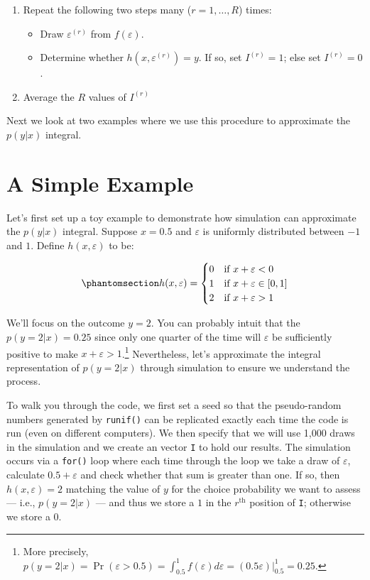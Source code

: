 \documentclass[
  letterpaper,
  DIV=11,
  numbers=noendperiod]{scrreprt}
\providecommand{\tightlist}{%
  \setlength{\itemsep}{0pt}\setlength{\parskip}{0pt}}\usepackage{longtable,booktabs,array}
\begin{document}
\begin{enumerate}
\def\labelenumi{\arabic{enumi}.}
\tightlist
\item
  Repeat the following two steps many (\(r=1, \ldots, R\)) times:

  \begin{itemize}
  \tightlist
  \item
    Draw \(\varepsilon^{(r)}\) from \(f(\varepsilon)\).
  \item
    Determine whether \(h(x,\varepsilon^{(r)}) = y\). If so, set
    \(I^{(r)}=1\); else set \(I^{(r)}=0\).
  \end{itemize}
\item
  Average the \(R\) values of \(I^{(r)}\)
\end{enumerate}

Next we look at two examples where we use this procedure to approximate
the \(p(y|x)\) integral.

\section{A Simple Example}\label{sec-simple_example}

Let's first set up a toy example to demonstrate how simulation can
approximate the \(p(y|x)\) integral. Suppose \(x=0.5\) and
\(\varepsilon\) is uniformly distributed between \(-1\) and \(1\).
Define \(h(x, \varepsilon)\) to be:

\begin{equation}\phantomsection\label{eq-h_uniform}{
h(x, \varepsilon) = 
    \begin{cases}
        0  & \text{if } x + \varepsilon < 0 \\
        1  & \text{if } x + \varepsilon \in [0,1] \\
        2  & \text{if } x + \varepsilon > 1
    \end{cases}
}\end{equation}

We'll focus on the outcome \(y=2\). You can probably intuit that the
\(p(y=2 | x) = 0.25\) since only one quarter of the time will
\(\varepsilon\) be sufficiently positive to make
\(x + \varepsilon > 1\).\footnote{More precisely,
  \(p(y=2|x) = \Pr(\varepsilon > 0.5) = \int_{0.5}^1 f(\varepsilon) d\varepsilon = (0.5\varepsilon)\vert_{0.5}^1 = 0.25\).}
Nevertheless, let's approximate the integral representation of
\(p(y=2|x)\) through simulation to ensure we understand the process.

To walk you through the code, we first set a seed so that the
pseudo-random numbers generated by \texttt{runif()} can be replicated
exactly each time the code is run (even on different computers). We then
specify that we will use 1,000 draws in the simulation and we create an
vector \texttt{I} to hold our results. The simulation occurs via a
\texttt{for()} loop where each time through the loop we take a draw of
\(\varepsilon\), calculate \(0.5 + \varepsilon\) and check whether that
sum is greater than one. If so, then \(h(x,\varepsilon)=2\) matching the
value of \(y\) for the choice probability we want to assess --- i.e.,
\(p(y=2|x)\) --- and thus we store a \(1\) in the \(r^\textrm{th}\)
position of \texttt{I}; otherwise we store a 0.
\end{document}

